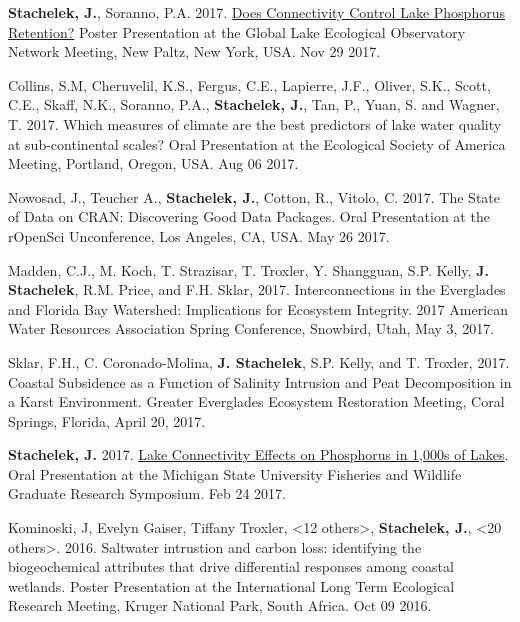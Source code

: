 \documentclass[11pt]{article}
\makeatletter
\newlength{\bibhang}
\newlength{\bibsep}
 {\@listi \global\bibsep\itemsep \global\advance\bibsep by\parsep}
\newenvironment{bibenum*}
  {\renewcommand\labelenumi{[\theenumi]}%
   \etaremune[
     topsep=0pt,
     itemsep=\bibsep,
     parsep=0pt,partopsep=0pt,
     itemindent=-\bibhang,
     leftmargin={\bibhang+\widthof{[999]}}]}
  {\endetaremune}
\makeatother
\begin{document}
\begin{bibenum*}
  \item \textbf{Stachelek, J.}, Soranno, P.A. 2017. \href{https://doi.org/10.6084/m9.figshare.9638735.v1}{Does Connectivity Control Lake Phosphorus Retention?} Poster Presentation at the Global Lake Ecological Observatory Network Meeting, New Paltz, New York, USA. Nov 29 2017.

  \item Collins, S.M, Cheruvelil, K.S., Fergus, C.E., Lapierre, J.F., Oliver, S.K., Scott, C.E., Skaff, N.K., Soranno, P.A., \textbf{Stachelek, J.}, Tan, P., Yuan, S. and Wagner, T. 2017. Which measures of climate are the best predictors of lake water quality at sub-continental scales? Oral Presentation at the Ecological Society of America Meeting, Portland, Oregon, USA. Aug 06 2017.

  \item Nowosad, J., Teucher A., \textbf{Stachelek, J.}, Cotton, R., Vitolo, C. 2017. The State of Data on CRAN: Discovering Good Data Packages. Oral Presentation at the rOpenSci Unconference, Los Angeles, CA, USA. May 26 2017.

  \item Madden, C.J., M. Koch, T. Strazisar, T. Troxler, Y. Shangguan, S.P. Kelly, \textbf{J. Stachelek}, R.M. Price, and F.H. Sklar, 2017. Interconnections in the Everglades and Florida Bay Watershed: Implications for Ecosystem Integrity. 2017 American Water Resources Association Spring Conference, Snowbird, Utah, May 3, 2017.

  \item Sklar, F.H., C. Coronado-Molina, \textbf{J. Stachelek}, S.P. Kelly, and T. Troxler, 2017. Coastal Subsidence as a Function of Salinity Intrusion and Peat Decomposition in a Karst Environment. Greater Everglades Ecosystem Restoration Meeting, Coral Springs, Florida, April 20, 2017.

  \item \textbf{Stachelek, J.} 2017. \href{https://doi.org/10.6084/m9.figshare.8187038.v1}{Lake Connectivity Effects on Phosphorus in 1,000s of Lakes}. Oral Presentation at the Michigan State University Fisheries and Wildlife Graduate Research Symposium. Feb 24 2017.

  \item Kominoski, J, Evelyn Gaiser, Tiffany Troxler, <12 others>, \textbf{Stachelek, J.}, <20 others>. 2016. Saltwater intrustion and carbon loss: identifying the biogeochemical attributes that drive differential responses among coastal wetlands. Poster Presentation at the International Long Term Ecological Research Meeting, Kruger National Park, South Africa. Oct 09 2016.


\end{bibenum*}
\end{document}
